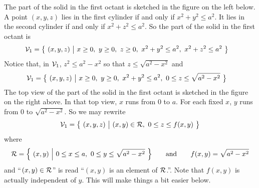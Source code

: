 \begin{eg}[Volume]
\begin{itemize}
\end{itemize}
\noindent
The part of the solid in the first octant is sketched in the figure
on the left below. A point $(x,y,z)$ lies in the first cylinder
if and only if $x^2+y^2\le a^2$. 
It lies in the second cylinder if and only if $x^2+z^2\le a^2$.
So the part of the solid in the first octant is
\begin{align*}
\cV_1&=\Set{(x,y,z)}{x\ge 0,\ y\ge 0,\ z\ge 0,\ x^2+y^2\le a^2,\ x^2+z^2\le a^2}
\end{align*}
Notice that, in $\mathcal{V}_1$, $z^2\le a^2-x^2$ so that $z\le\sqrt{a^2-x^2}$ and
\begin{align*}
\mathcal{V}_1
&=\big\{ \ (x,y,z)\ \big|\ x\ge 0,\ y\ge 0,\ x^2+y^2\le a^2,\ 0\le z\le \sqrt{a^2-x^2}\ \big\}
\end{align*}
The top view of the part of the solid in the first octant is sketched 
in the figure on the right above. In that top view, $x$ runs from $0$
to $a$. For each fixed $x$, $y$ runs from $0$ to $\sqrt{a^2-x^2}$.
So we may rewrite
\begin{align*}
\mathcal{V}_1=\big\{ \ (x,y,z)\ \big|\ (x,y)\in\mathcal{R},\ 0\le z\le f(x,y)\ \big\}
\end{align*}
where
\begin{equation*}
\cR=\Big\{\ (x,y)\ \Big|\ 0\le x\le a,\ 0\le y\le \sqrt{a^2-x^2}\ \Big\}
\qquad\text{and}\qquad f(x,y) = \sqrt{a^2-x^2}
\end{equation*}
and ``$(x,y)\in\mathcal{R}$'' is read ``$(x,y)$ is an element of $\mathcal{R}$.''.
Note that $f(x,y)$ is actually independent of $y$. This will make things 
a bit easier below.


\end{eg}
